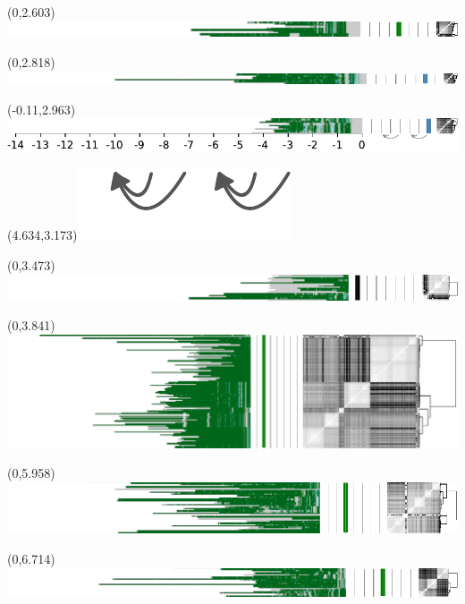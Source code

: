 \documentclass{article}
\begin{document}
\begin{textblock}{13}(0,2.603)\includegraphics{./Figure_S4/3ptel_1-500K_1_12_12-HG004.pdf}\end{textblock}
\begin{textblock}{13}(0,2.818)\includegraphics{./Figure_S4/3ptel_1-500K_1_12_12-HG006.pdf}\end{textblock}
\begin{textblock}{13}(-0.11,2.963)\includegraphics{./Figure_S4/3ptel_1-500K_1_12_12-HG007.pdf}\end{textblock}
\begin{textblock}{13}(4.634,3.173)\includegraphics[width=.78in,keepaspectratio]{Figure_4/fatter-arrows.pdf}\end{textblock}
\begin{textblock}{13}(0,3.473)\includegraphics{./Figure_S4/4ptel_1-500K_1_12_12-HG001.pdf}\end{textblock}
\begin{textblock}{13}(0,3.841)\includegraphics{./Figure_S4/4ptel_1-500K_1_12_12-HG002.pdf}\end{textblock}
\begin{textblock}{13}(0,5.958)\includegraphics{./Figure_S4/4ptel_1-500K_1_12_12-HG003.pdf}\end{textblock}
\begin{textblock}{13}(0,6.714)\includegraphics{./Figure_S4/4ptel_1-500K_1_12_12-HG004.pdf}\end{textblock}
\end{document}
